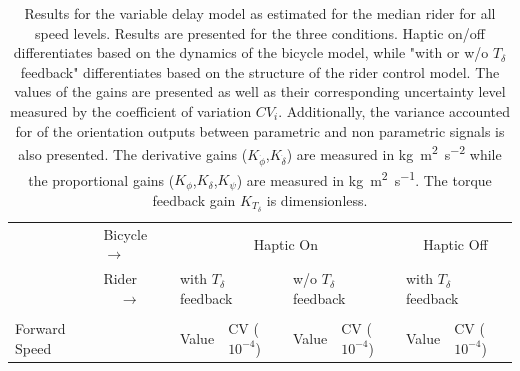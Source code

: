 \begin{table}[]
    \caption{ Results for the variable delay model as estimated for the median rider for all speed levels. Results are presented for the three conditions. Haptic on/off differentiates based on the dynamics of the bicycle model, while "with or w/o \ensuremath{T_\delta} feedback" differentiates based on the structure of the rider control model. The values of the gains are presented as well as their corresponding uncertainty level measured by the coefficient of variation \ensuremath{CV_i}. Additionally, the variance accounted for of the orientation outputs between parametric and non parametric signals is also presented. The derivative gains (\ensuremath{K_{\dot{\phi}}},\ensuremath{K_{\dot{\delta}}}) are measured in \si{\kilogram\square\meter\per\square\second} while the proportional gains (\ensuremath{K_{\phi}},\ensuremath{K_{\delta}},\ensuremath{K_{\psi}}) are measured in \si{\kilogram\square\meter\per\second}. The torque feedback gain \ensuremath{K_{T_\delta}} is dimensionless.}
    \label{tb:variable}
    \begin{tabular}{llcccccc}
    \hline
                                                   & Bicycle $\rightarrow$                                  & \multicolumn{4}{c}{Haptic On}                                                                                                                                                                           & \multicolumn{2}{c}{Haptic Off}                                                                     \\ \cline{2-8} 
                                                   & {\color[HTML]{333333} Rider $\;\;\;\;\rightarrow$} & \multicolumn{2}{l}{with $T_\delta$ feedback}                                                       & \multicolumn{2}{l}{w/o  $T_\delta$ feedback}                                                       & \multicolumn{2}{l}{with $T_\delta$ feedback}                                                       \\ \cline{2-8} 
                                                   &                                                        & \multicolumn{1}{l}{}                        & \multicolumn{1}{l}{}                                 & \multicolumn{1}{l}{}                        & \multicolumn{1}{l}{}                                 & \multicolumn{1}{l}{}                        & \multicolumn{1}{l}{}                                 \\
    \multirow{-2}{*}{Forward Speed}                &                                                        & \multicolumn{1}{l}{\multirow{-2}{*}{Value}} & \multicolumn{1}{l}{\multirow{-2}{*}{CV ($10^{-4}$)}} & \multicolumn{1}{l}{\multirow{-2}{*}{Value}} & \multicolumn{1}{l}{\multirow{-2}{*}{CV ($10^{-4}$)}} & \multicolumn{1}{l}{\multirow{-2}{*}{Value}} & \multicolumn{1}{l}{\multirow{-2}{*}{CV ($10^{-4}$)}} \\ \hline

\end{tabular}
\end{table}

